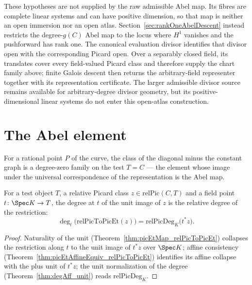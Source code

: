 These hypotheses are not supplied by the raw admissible Abel map.  Its fibres are complete
linear systems and can have positive dimension, so that map is neither an open immersion nor
an open atlas.  Section~\ref{sec:rankOneAbelDescent} instead restricts the degree-\(g(C)\) Abel
map to the locus where \(H^1\) vanishes and the pushforward has rank one.  The canonical
evaluation divisor identifies that divisor open with the corresponding Picard open.  Over a
separably closed field, its translates cover every field-valued Picard class and therefore
supply the chart family above; finite Galois descent then returns the arbitrary-field
representer together with its representation certificate.  The larger admissible divisor
source remains available for arbitrary-degree divisor geometry, but its positive-dimensional
linear systems do not enter this open-atlas construction.

\section{The Abel element}
\label{sec:abelElement}

For a rational point \(P\) of the curve, the class of the diagonal minus the constant graph
is a degree-zero family on the test \(T = C\) — the element whose image under the universal
correspondence of the representation is the Abel map.

\begin{theorem}
  \label{thm:degAt_relPicToPicEt}
  \leanok
  For a test object \(T\), a relative Picard class \(z \in \mathrm{relPic}(C,T)\) and a
  field point \(t \colon \Spec K \to T\), the degree at \(t\) of the unit image of \(z\) is
  the relative degree of the restriction:
  \[
    \deg_t\bigl(\mathrm{relPicToPicEt}(z)\bigr) = \mathrm{relPicDeg}_K\bigl(t^{*} z\bigr).
  \]
\end{theorem}
\begin{proof}
  \leanok
  Naturality of the unit (Theorem~\ref{thm:picEtMap_relPicToPicEt}) collapses the
  restriction along \(t\) to the unit image of \(t^{*}z\) over \(\Spec K\); affine
  consistency (Theorem~\ref{thm:picEtAffineEquiv_relPicToPicEt}) identifies its affine
  collapse with the plus unit of \(t^{*}z\); the unit normalization of the degree
  (Theorem~\ref{thm:degAff_unit}) reads \(\mathrm{relPicDeg}_K\).
\end{proof}

